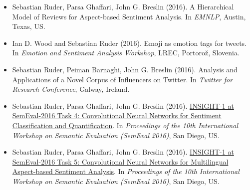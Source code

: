 \documentclass[10pt,letterpaper]{article}
\makeatletter
\newcommand{\headerrow}[2]
{\begin{tabular*}{\linewidth}{l@{\extracolsep{\fill}}r}
	#1 &
	#2 \\
\end{tabular*}}
\makeatother
\begin{document}
\begin{itemize}
	\parskip=0.1em
	
	\item Sebastian Ruder, Parsa Ghaffari, John G. Breslin (2016). A Hierarchical Model of Reviews for Aspect-based Sentiment Analysis. In \textit{EMNLP}, Austin, Texas, US.
	
	\item Ian D. Wood and Sebastian Ruder (2016). Emoji as emotion tags for tweets. In \textit{Emotion and Sentiment Analysis Workshop}, LREC, Portorož, Slovenia.
	
	\item Sebastian Ruder, Peiman Barnaghi, John G. Breslin (2016). Analysis and Applications of a Novel Corpus of Influencers on Twitter. In \textit{Twitter for Research Conference}, Galway, Ireland.
	
	\item Sebastian Ruder, Parsa Ghaffari, John G. Breslin (2016). \href{http://www.anthology.aclweb.org/S/S16/S16-1026.pdf}{INSIGHT-1 at SemEval-2016 Task 4: Convolutional Neural Networks for Sentiment Classification and Quantification}. In \textit{Proceedings of the 10th International Workshop on Semantic Evaluation (SemEval 2016)}, San Diego, US.
	
	\item Sebastian Ruder, Parsa Ghaffari, John G. Breslin (2016). \href{http://www.aclweb.org/anthology/S/S16/S16-1053.pdf}{INSIGHT-1 at SemEval-2016 Task 5: Convolutional Neural Networks for Multilingual Aspect-based Sentiment Analysis}. In \textit{Proceedings of the 10th International Workshop on Semantic Evaluation (SemEval 2016)}, San Diego, US.

\end{itemize}

%
%	
%
\end{document}

